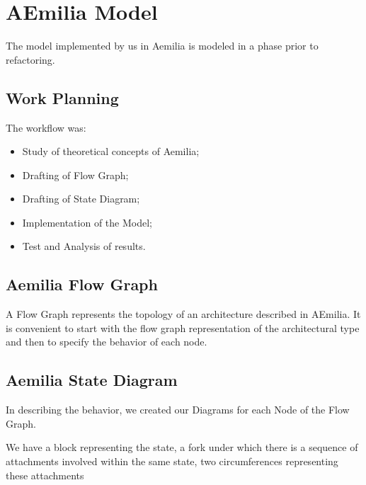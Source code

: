 \chapter{\textbf{AEmilia Model}}

The model implemented by us in Aemilia is modeled in a phase prior to refactoring.

\section{Work Planning}

The workflow was:
\begin{itemize}
\item Study of theoretical concepts of Aemilia;
\item Drafting of Flow Graph;
\item Drafting of State Diagram;
\item Implementation of the Model;
\item Test and Analysis of results.
\end{itemize}

\section{Aemilia Flow Graph}

A Flow Graph represents the topology of an architecture described in AEmilia. It is convenient to start with the flow graph representation of the architectural type and then to specify the behavior of each node.  

\begin{center}
\end{center}
\bigskip
{} 

\section{Aemilia State Diagram}

In describing the behavior, we created our Diagrams for each Node of the Flow Graph.

\begin{minipage}{0.3\textwidth}
\bigskip
\end{minipage}
\hfill
\begin{minipage}{0.4\textwidth}\raggedleft
We have a block representing the state, a fork under which there is a
sequence of attachments involved within the same state, two circumferences representing these attachments
\end{minipage}
\bigskip

